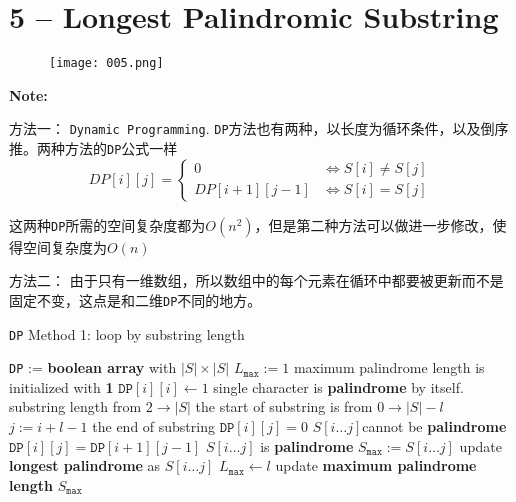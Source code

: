 \documentclass[a4paper,12pt]{article}
\begin{document}
\section{5 -- Longest Palindromic Substring}
\begin{figure}[H]
	\begin{center}
		\texttt{[image: 005.png]}
	\end{center}
\end{figure}
\textbf{\large{Note:}}
\par
\vspace{0.5em}
\begin{CJK*}{UTF8}{gbsn}
方法一： \texttt{Dynamic Programming}. \texttt{DP}方法也有两种，以长度为循环条件，以及倒序推。两种方法的\texttt{DP}公式一样
\[
DP[i][j]  = 
\begin{cases}
 0 & \iff S[i] \neq S[j] \\
 DP[i+1][j-1] &\iff S[i] = S[j]
\end{cases}
\]
\par
这两种\texttt{DP}所需的空间复杂度都为$O(n^2)$，但是第二种方法可以做进一步修改，使得空间复杂度为$O(n)$
\par
方法二： 由于只有一维数组，所以数组中的每个元素在循环中都要被更新而不是固定不变，这点是和二维\texttt{DP}不同的地方。
\clearpage
\end{CJK*}
\setcounter{algorithm}{0}
\begin{algorithm}[H]
\caption{\texttt{DP} Method 1: loop by substring length}
\begin{algorithmic}[1]
\State \texttt{DP} := \textbf{boolean array} with $|S|\times|S|$
\State $L_\mathtt{max} := 1$ \Comment maximum palindrome length is initialized with \textbf{1} 
\State $\mathtt{DP}[i][i] \gets 1$ \Comment single character is \textbf{palindrome} by itself.
\EndFor
{} \Comment substring length from $2 \to |S|$
 \Comment the start of substring is from $0 \to |S| - l$
\State $j := i + l - 1$ \Comment the end of substring
\State $\mathtt{DP}[i][j] = 0$ \Comment $S[i\ldots j] $cannot be \textbf{palindrome}
\Else
\State $\mathtt{DP}[i][j] = \mathtt{DP}[i+1][j-1]$ 
\EndIf
{} \Comment $S[i\ldots j]$ is \textbf{palindrome}
\State $S_\mathtt{max} := S[i\ldots j]$ \Comment update \textbf{longest palindrome} as $S[i\ldots j]$
\State $L_\mathtt{max} \gets l$ \Comment update \textbf{maximum palindrome length}
\EndIf
\EndIf
\EndFor
\EndFor
\State \Return $S_\mathtt{max}$
\EndProcedure
\end{algorithmic}
\end{algorithm}
\end{document}
